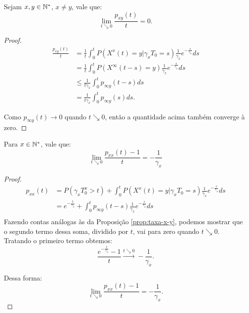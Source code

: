\begin{proposicao}
  \label{prop:taxa-x-y}
  Sejam $x, y \in {\mathbb{N^*}}$, $x \neq y$, vale que:
  \begin{displaymath}
    \lim_{t \searrow 0} \frac{p_{xy}(t)}{t} = 0.
  \end{displaymath}
\end{proposicao}
\begin{proof}
  \begin{align*}
    \frac{p_{x y} (t)}{t}
    &= \frac{1}{t}\int_{0}^{t} P( X^x(t) = y |
    \gamma_x T_0 = s) \frac{1}{\gamma_x} e^{-\frac{s}{\gamma_x}} ds\\
    &= \frac{1}{t} \int_{0}^{t} P( X^\infty(t-s) = y ) \frac{1}{\gamma_x}
    e^{-\frac{s}{\gamma_x}} ds \\
    &\leq \frac{1}{t \gamma_x} \int_{0}^{t} p_{\infty y}(t-s) ds \\
    &= \frac{1}{t \gamma_x} \int_{0}^{t} p_{\infty y}(s) ds.
  \end{align*}

  Como $p_{\infty y} (t) \to 0$ quando $t \searrow 0$, então a
  quantidade acima também converge à zero.
\end{proof}

\begin{proposicao}
  \label{prop:taxa-x-x}
  Para $x \in {\mathbb{N^*}}$, vale que:
  \begin{displaymath}
    \lim_{t \searrow 0} \frac{p_{xx}(t) - 1}{t} = -\frac{1}{\gamma_x}
  \end{displaymath}
\end{proposicao}
\begin{proof}
  \begin{align*}
    p_{xx} (t)
    &= P( \gamma_x T_0^x > t) + 
    \int_{0}^{t} P( X^x(t) = y |
    \gamma_x T_0 = s) \frac{1}{\gamma_x} e^{-\frac{s}{\gamma_x}} ds\\
    &= e^{-\frac{t}{\gamma_x}} + 
    \int_{0}^{t} p_{\infty y}(t-s) \frac{1}{\gamma_x} e^{-\frac{s}{\gamma_x}} ds\\
  \end{align*}
  Fazendo contas análogas às da Proposição \ref{prop:taxa-x-y},
  podemos mostrar que o segundo termo dessa soma, dividido por $t$,
  vai para zero quando $t \searrow 0$. Tratando o primeiro termo
  obtemos:
  \begin{displaymath}
    \frac{e^{-\frac{t}{\gamma_x}} - 1}{t} \xrightarrow{t \searrow 0}
    -\frac{1}{\gamma_x}.
  \end{displaymath}

  Dessa forma:
  \begin{displaymath}
     \lim_{t \searrow 0} \frac{p_{xx} (t) - 1}{t} = -\frac{1}{\gamma_x}.
  \end{displaymath}
  
\end{proof}


